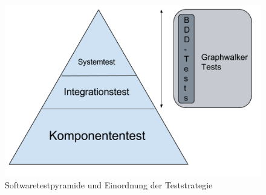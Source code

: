 \begin{figure}[h] 
  \centering
     \includegraphics[width=1.0\textwidth]{figures/pyramide_mbt_bdd.png}
  \caption{Softwaretestpyramide und Einordnung der Teststrategie}
  \label{fig:pyramide}
\end{figure}

